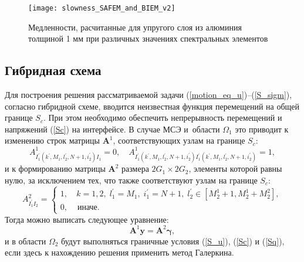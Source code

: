 \documentclass[press]{vestnik}
\begin{document}
\begin{figure}
	\begin{center}
		\texttt{[image: slowness\_SAFEM\_and\_BIEM\_v2]}
		\caption{Медленности, расчитанные для упругого слоя из алюминия толщиной 1 мм при различных значениях спектральных элементов}
		 \label{slowness}
	\end{center}
\end{figure}

	\subsection{Гибридная схема}
Для построения решения рассматриваемой задачи (\ref{motion_eq_u})--(\ref{S_sigm}), согласно гибридной схеме, вводится неизвестная функция перемещений на общей границе $S_{c}$. При этом необходимо обеспечить непрерывность перемещений и напряжений (\ref{Sc}) на интерфейсе. В случае МСЭ и~области $\Omega_{1}$ это приводит к изменению строк матрицы $\bm{A}^{1}$, соответствующих узлам на границе $S_{c}$:
$$
A_{I_{1}^{'}(k^{'},M_{1},l_{2}^{'},N+1,i_{2}^{'}) I_{1}^{}}^{1} = 0, \quad A_{I_{1}^{'}(k^{'},M_{1},l_{2}^{'},N+1,i_{2}^{'}) I_{1}^{'}(k^{'},M_{1},l_{2}^{'},N+1,i_{2}^{'})}^{1} = 1,
$$
и к формированию матрицы  $\bm{A}^{2}$ размера $2G_{1} \times 2G_{2}$, элементы которой равны нулю, за исключением тех, что также соответствуют узлам на границе $S_{c}$:
$$
A_{I_{1}^{'}I_{2}}^{2}= 
\left\{ 
\begin{array}{cl}
	1, &\ k=1, 2, \; l_{1}^{'}=M_{1}, \; i_{1}^{'}=N+1, \; l_{2}^{'} \in [M_{2}^{1}+1, M_{2}^{1}+M_{2}^{2}], 
	\\
	0, &\text{ иначе}.
\end{array} 
\right.
$$
Тогда можно выписать следующее уравнение:
$$
\bm{A}^{1} \bm{y} = \bm{A}^{2} \bm{\gamma},
$$
и в области $\Omega_{2}$ будут выполняться граничные условия (\ref{S_u}), (\ref{Sc}) и (\ref{Sq}), если здесь к нахождению решения применить метод Галеркина.
\end{document}
